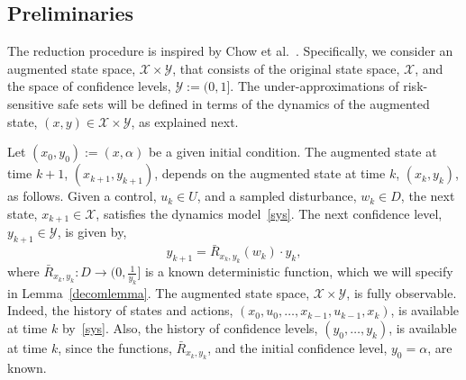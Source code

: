 \documentclass[letterpaper, 10 pt, conference]{ieeeconf}  %
\begin{document}
\subsection{Preliminaries}
The reduction procedure is inspired by Chow et al.~\cite{chow2015risk}. Specifically, we consider an augmented state space, $\mathcal{X} \times \mathcal{Y}$, that consists of the original state space, $\mathcal{X}$, 
and the space of confidence levels, $\mathcal{Y} := (0,1]$.
The under-approximations of risk-sensitive safe sets will be defined in terms of the dynamics of the augmented state,
$(x,y) \in \mathcal{X} \times \mathcal{Y}$, as explained next.

Let $(x_0, y_0) := (x, \alpha)$ be a given initial condition.
The augmented state at time $k+1$, $(x_{k+1}, y_{k+1})$, depends on the augmented state at time $k$, $(x_k, y_k)$, as follows.
Given a control, $u_k \in U$, and a sampled disturbance, $w_k \in D$, the next state, $x_{k+1} \in \mathcal{X}$, satisfies the dynamics model~\eqref{sys}. 
The next confidence level, $y_{k+1} \in \mathcal{Y}$, is given by,
\begin{equation}
y_{k+1} = \bar{R}_{x_k,y_k}(w_k) \cdot y_k,\label{Rbar}
\end{equation}
where $\bar{R}_{x_k, y_k} : D \to (0, \frac{1}{y_k}]$ is a known deterministic function, 
which we will specify in Lemma~\ref{decomlemma}. 
The augmented state space, $\mathcal{X} \times \mathcal{Y}$, is fully observable.
Indeed, the history of states and actions, $(x_0, u_0, \hdots, x_{k-1}, u_{k-1}, x_{k})$, is available at time $k$ by~\eqref{sys}. 
Also, the history of confidence levels, $(y_0, \hdots, y_k)$, is available at time $k$, since
the functions, $\bar{R}_{x_k,y_k}$, and the initial confidence level, $y_0 = \alpha$, are known.
\end{document}
